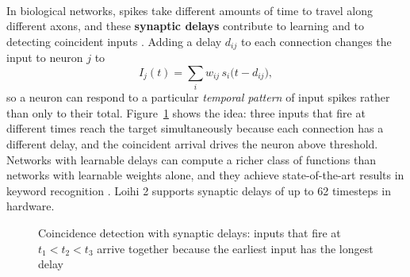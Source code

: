 \documentclass[12pt,a4paper,final]{extreport}
\begin{document}
\paragraph{} In biological networks, spikes take different amounts of time to travel along different axons, and these \textbf{synaptic delays} contribute to learning and to detecting coincident inputs \cite{p1}. Adding a delay $d_{ij}$ to each connection changes the input to neuron $j$ to
\begin{equation}
I_j(t)=\sum_{i}w_{ij}\,s_i\big(t-d_{ij}\big),
\end{equation}
so a neuron can respond to a particular \emph{temporal pattern} of input spikes rather than only to their total. Figure~\ref{fig:delays} shows the idea: three inputs that fire at different times reach the target simultaneously because each connection has a different delay, and the coincident arrival drives the neuron above threshold. Networks with learnable delays can compute a richer class of functions than networks with learnable weights alone, and they achieve state-of-the-art results in keyword recognition \cite{p1}. Loihi 2 supports synaptic delays of up to 62 timesteps in hardware.

\begin{figure}[htbp]
\centering
{}
\caption{Coincidence detection with synaptic delays: inputs that fire at $t_1<t_2<t_3$ arrive together because the earliest input has the longest delay}
\label{fig:delays}
\end{figure}
\end{document}
